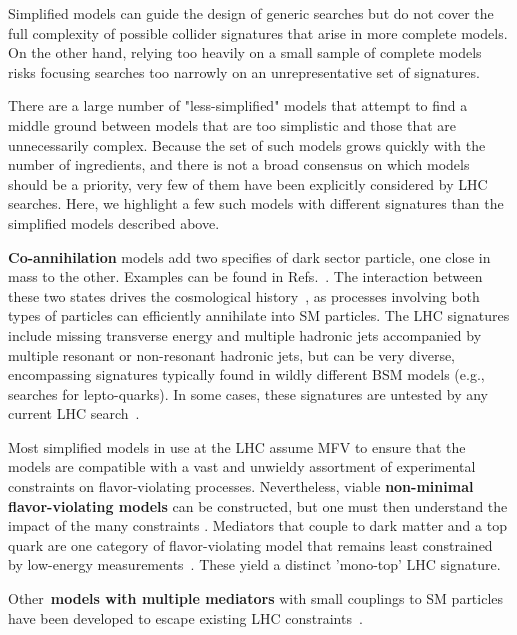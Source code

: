 
Simplified models can guide the design of generic searches but do not cover the full complexity of possible collider signatures that arise in more complete models.
On the other hand, relying too heavily on a small sample of complete models risks focusing searches too narrowly on an unrepresentative set of signatures.

There are a large number of "less-simplified" models that attempt to find a middle ground between models that are too simplistic and those that are unnecessarily complex. Because the set of such models grows quickly with the number of ingredients, and there is not a broad consensus on which models should be a priority, very few of them have been explicitly considered by LHC searches. Here, we highlight a few such models with different signatures than the simplified models described above. 

\textbf{Co-annihilation} models add two specifies of dark sector particle, one close in mass to the other. Examples can be found in Refs.~\cite{Buschmann:2016hkc,Khoze:2017ixx}. The interaction between these two states drives the cosmological history~\cite{Ellis:1999mm}, as processes involving both types of particles can efficiently annihilate into SM particles. The LHC signatures include missing transverse energy and multiple hadronic jets accompanied by multiple resonant or non-resonant hadronic jets, but can be very diverse, encompassing signatures typically found in wildly different BSM models (e.g., searches for lepto-quarks). In some cases, these signatures are untested by any current LHC search~\cite{Buschmann:2016hkc}. 

Most simplified models in use at the LHC assume MFV to ensure that the models are compatible with a vast and unwieldy assortment of experimental constraints on flavor-violating processes. Nevertheless, viable \textbf{non-minimal flavor-violating models} can be constructed, but one must then understand the impact of the many constraints \cite{Blanke:2017tnb}. Mediators that couple to dark matter and a top quark are one category of flavor-violating model that remains least constrained by low-energy measurements~\cite{DHondt:2015nat}. These yield a distinct 'mono-top' LHC signature. 

Other~\textbf{models with multiple mediators} with small couplings to SM particles have been developed to escape existing LHC constraints~\cite{Duerr:2016tmh}. 

